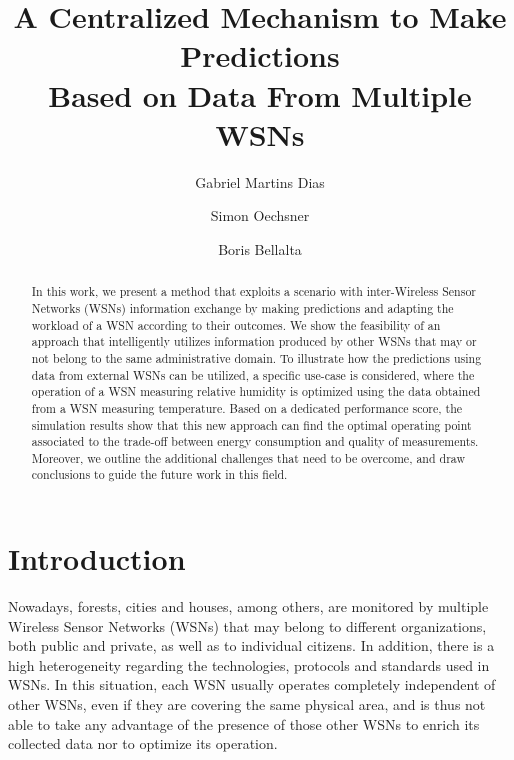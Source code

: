 \documentclass{llncs}
\begin{document}
\title{A Centralized Mechanism to Make Predictions \\ Based on Data From Multiple 
WSNs}

\author{Gabriel Martins Dias \and Simon Oechsner \and 
Boris Bellalta}





\maketitle

\begin{abstract}




In this work, we present a method that exploits a scenario with inter-Wireless 
Sensor Networks (WSNs) information exchange by making predictions and adapting 
the workload of a WSN according to their outcomes. We show the feasibility of 
an approach that intelligently utilizes information produced by other WSNs that 
may or not belong to the same administrative domain. To illustrate how the 
predictions using data from external WSNs can be utilized, a specific use-case 
is considered, where the operation of a WSN measuring relative humidity is 
optimized using the data obtained from a WSN measuring temperature. 
Based on a dedicated performance score, the simulation results show that this 
new approach can find the optimal operating point associated to the trade-off 
between energy consumption and quality of measurements. Moreover, we outline the 
additional challenges that need to be overcome, and draw conclusions to guide 
the future work in this field.

\end{abstract}

\section{Introduction}

Nowadays, forests, cities and houses, among others, are monitored by multiple 
Wireless Sensor Networks (WSNs) that may belong to different organizations, both 
public and private, as well as to individual citizens. In addition, there is a 
high heterogeneity regarding the technologies, protocols and standards used in 
WSNs. In this situation, each WSN usually operates completely independent of 
other WSNs, even if they are covering the same physical area, and is thus not 
able to take any advantage of the presence of those other WSNs to enrich its 
collected data nor to optimize its operation.
\end{document}
